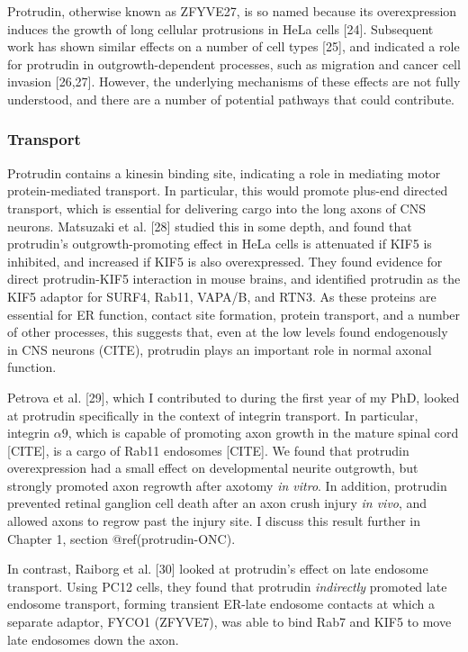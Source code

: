 \documentclass[
  12pt,
  a4paper,
]{article}
\begin{document}
Protrudin, otherwise known as ZFYVE27, is so named because its
overexpression induces the growth of long cellular protrusions in HeLa
cells {[}24{]}. Subsequent work has shown similar effects on a number of
cell types {[}25{]}, and indicated a role for protrudin in
outgrowth-dependent processes, such as migration and cancer cell
invasion {[}26,27{]}. However, the underlying mechanisms of these
effects are not fully understood, and there are a number of potential
pathways that could contribute.

\hypertarget{intro-ptdn-transport}{%
\subsubsection{Transport}\label{intro-ptdn-transport}}

Protrudin contains a kinesin binding site, indicating a role in
mediating motor protein-mediated transport. In particular, this would
promote plus-end directed transport, which is essential for delivering
cargo into the long axons of CNS neurons. Matsuzaki et al. {[}28{]}
studied this in some depth, and found that protrudin's
outgrowth-promoting effect in HeLa cells is attenuated if KIF5 is
inhibited, and increased if KIF5 is also overexpressed. They found
evidence for direct protrudin-KIF5 interaction in mouse brains, and
identified protrudin as the KIF5 adaptor for SURF4, Rab11, VAPA/B, and
RTN3. As these proteins are essential for ER function, contact site
formation, protein transport, and a number of other processes, this
suggests that, even at the low levels found endogenously in CNS neurons
(CITE), protrudin plays an important role in normal axonal function.

Petrova et al. {[}29{]}, which I contributed to during the first year of
my PhD, looked at protrudin specifically in the context of integrin
transport. In particular, integrin \(\alpha9\), which is capable of
promoting axon growth in the mature spinal cord {[}CITE{]}, is a cargo
of Rab11 endosomes {[}CITE{]}. We found that protrudin overexpression
had a small effect on developmental neurite outgrowth, but strongly
promoted axon regrowth after axotomy \emph{in vitro}. In addition,
protrudin prevented retinal ganglion cell death after an axon crush
injury \emph{in vivo}, and allowed axons to regrow past the injury site.
I discuss this result further in Chapter 1, section @ref(protrudin-ONC).

In contrast, Raiborg et al. {[}30{]} looked at protrudin's effect on
late endosome transport. Using PC12 cells, they found that protrudin
\emph{indirectly} promoted late endosome transport, forming transient
ER-late endosome contacts at which a separate adaptor, FYCO1 (ZFYVE7),
was able to bind Rab7 and KIF5 to move late endosomes down the axon.
\end{document}
